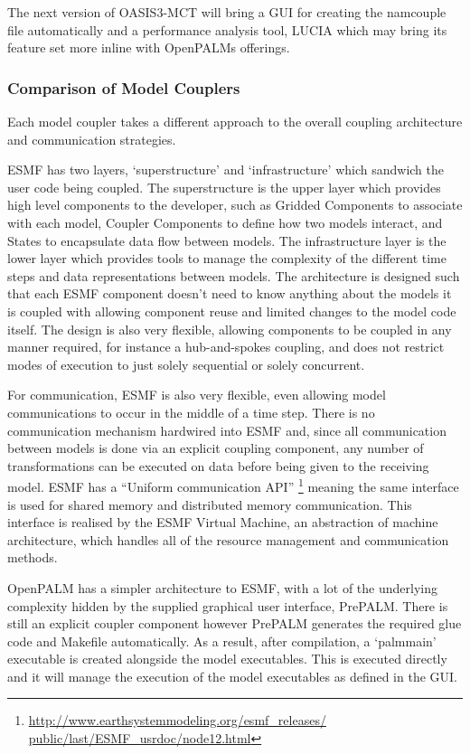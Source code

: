 \documentclass{acm_proc_article-sp}
\renewcommand{\_}{\underscore\hspace{0pt}}
\begin{document}
The next version of OASIS3-MCT will bring a GUI for creating the namcouple file
automatically and a performance analysis tool, LUCIA \cite{Maisonnave} which may
bring its feature set more inline with OpenPALMs offerings.

\subsubsection*{Comparison of Model Couplers}

Each model coupler takes a different approach to the overall coupling
architecture and communication strategies.

ESMF has two layers, `superstructure' and `infrastructure' which sandwich the
user code being coupled. The superstructure is the upper layer which provides
high level components to the developer, such as Gridded Components to associate
with each model, Coupler Components to define how two models interact, and
States to encapsulate data flow between models. The infrastructure layer is the
lower layer which provides tools to manage the complexity of the different time
steps and data representations between models. The architecture is designed such
that each ESMF component doesn't need to know anything about the models it is
coupled with allowing component reuse and limited changes to the model code
itself. The design is also very flexible, allowing components to be coupled in
any manner required, for instance a hub-and-spokes coupling, and does not
restrict modes of execution to just solely sequential or solely concurrent.

For communication, ESMF is also very flexible, even allowing model
communications to occur in the middle of a time step. There is no communication
mechanism hardwired into ESMF and, since all communication between models is
done via an explicit coupling component, any number of transformations can be
executed on data before being given to the receiving model. ESMF has a ``Uniform
communication API''
\footnote{\url{http://www.earthsystemmodeling.org/esmf_releases/
public/last/ESMF_usrdoc/node12.html}}
meaning the same interface is used for shared memory and distributed memory
communication. This interface is realised by the ESMF Virtual Machine, an
abstraction of machine architecture, which handles all of the resource
management and communication methods.

OpenPALM has a simpler architecture to ESMF, with a lot of the underlying
complexity hidden by the supplied graphical user interface, PrePALM. There is
still an explicit coupler component however PrePALM generates the required glue
code and Makefile automatically. As a result, after compilation, a `palm\_main'
executable is created alongside the model executables. This is executed directly
and it will manage the execution of the model executables as defined in the GUI.
\end{document}
